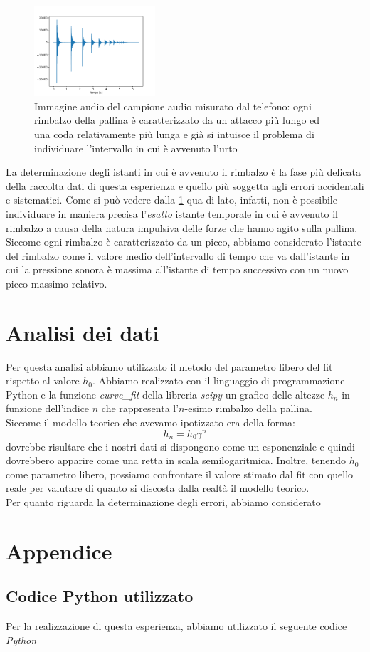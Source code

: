 \documentclass{article}
\begin{document}
\begin{figure}
	\centering
	\includegraphics[width=0.4\textwidth, scale=0.25]{Grafico_rimbalzo.pdf}
	\caption{Immagine audio del campione audio misurato dal telefono: ogni rimbalzo della pallina è caratterizzato da un attacco più lungo ed una coda relativamente più lunga e già si intuisce il problema di individuare l'intervallo in cui è avvenuto l'urto}
	\label{fig:audio}
\end{figure}

La determinazione degli istanti in cui è avvenuto il rimbalzo è la fase più delicata della raccolta dati di questa esperienza e quello più soggetta agli errori accidentali e sistematici. Come si può vedere dalla \ref{fig:audio} qua di lato, infatti, non è possibile individuare in maniera precisa l'\emph{esatto} istante temporale in cui è avvenuto il rimbalzo a causa della natura impulsiva delle forze che hanno agito sulla pallina. \\
Siccome ogni rimbalzo è caratterizzato da un picco, abbiamo considerato l'istante del rimbalzo come il valore medio dell'intervallo di tempo che va dall'istante in cui la pressione sonora è massima all'istante di tempo successivo con un nuovo picco massimo relativo.

\section{Analisi dei dati}

Per questa analisi abbiamo utilizzato il metodo del parametro libero del fit rispetto al valore $h_0$. Abbiamo realizzato con il linguaggio di programmazione Python e la funzione \emph{curve\_fit} della libreria \emph{scipy} un grafico delle altezze $h_n$ in funzione dell'indice $n$ che rappresenta l'$n$-esimo rimbalzo della pallina. \\
Siccome il modello teorico che avevamo ipotizzato era della forma:
$$
	h_n = h_0 \gamma^n
$$
dovrebbe risultare che i nostri dati si dispongono come un esponenziale e quindi dovrebbero apparire come una retta in scala semilogaritmica. Inoltre,  tenendo $h_0$ come parametro libero, possiamo confrontare il valore stimato dal fit con quello reale per valutare di quanto si discosta dalla realtà il modello teorico. \\
Per quanto riguarda la determinazione degli errori, abbiamo considerato 	

\section{Appendice}
\subsection{Codice Python utilizzato}
Per la realizzazione di questa esperienza, abbiamo utilizzato il seguente codice \emph{Python}
\begin{lstlisting}[language=Python]

\end{lstlisting}
\end{document}
